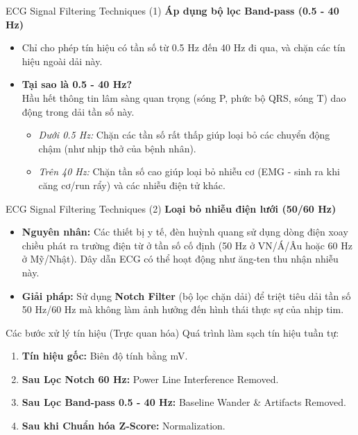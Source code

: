 \documentclass{beamer}
\begin{document}
\begin{frame}{ECG Signal Filtering Techniques (1)}
    \textbf{Áp dụng bộ lọc Band-pass (0.5 - 40 Hz)}
    \begin{itemize}
        \item Chỉ cho phép tín hiệu có tần số từ 0.5 Hz đến 40 Hz đi qua, và chặn các tín hiệu ngoài dải này.
        \item \textbf{Tại sao là 0.5 - 40 Hz?} \\ Hầu hết thông tin lâm sàng quan trọng (sóng P, phức bộ QRS, sóng T) dao động trong dải tần số này.
        \begin{itemize}
            \item \textit{Dưới 0.5 Hz:} Chặn các tần số rất thấp giúp loại bỏ các chuyển động chậm (như nhịp thở của bệnh nhân).
            \item \textit{Trên 40 Hz:} Chặn tần số cao giúp loại bỏ nhiễu cơ (EMG - sinh ra khi căng cơ/run rẩy) và các nhiễu điện tử khác.
        \end{itemize}
    \end{itemize}
\end{frame}

\begin{frame}{ECG Signal Filtering Techniques (2)}
    \textbf{Loại bỏ nhiễu điện lưới (50/60 Hz)}
    \begin{itemize}
        \item \textbf{Nguyên nhân:} Các thiết bị y tế, đèn huỳnh quang sử dụng dòng điện xoay chiều phát ra trường điện từ ở tần số cố định (50 Hz ở VN/Á/Âu hoặc 60 Hz ở Mỹ/Nhật). Dây dẫn ECG có thể hoạt động như ăng-ten thu nhận nhiễu này.
        \item \textbf{Giải pháp:} Sử dụng \textbf{Notch Filter} (bộ lọc chặn dải) để triệt tiêu dải tần số 50 Hz/60 Hz mà không làm ảnh hưởng đến hình thái thực sự của nhịp tim.
    \end{itemize}
\end{frame}

\begin{frame}{Các bước xử lý tín hiệu (Trực quan hóa)}
    Quá trình làm sạch tín hiệu tuần tự:
    \vspace{0.3cm}
    \begin{enumerate}
        \item \textbf{Tín hiệu gốc:} Biên độ tính bằng mV.
        \item \textbf{Sau Lọc Notch 60 Hz:} Power Line Interference Removed.
        \item \textbf{Sau Lọc Band-pass 0.5 - 40 Hz:} Baseline Wander \& Artifacts Removed.
        \item \textbf{Sau khi Chuẩn hóa Z-Score:} Normalization.
    \end{enumerate}
\end{frame}
\end{document}
